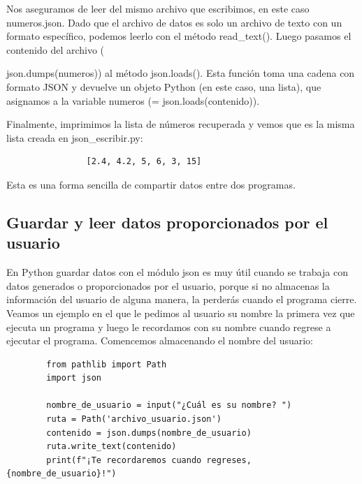 Nos aseguramos de leer del mismo archivo que escribimos, en este caso {\ttfamily numeros.json}. Dado que el archivo de datos es solo un archivo de texto con un formato específico, podemos leerlo con el método {\ttfamily read\_text()}. Luego pasamos el contenido del archivo ({{\ttfamily json.dumps(numeros)}) al método {\ttfamily json.loads()}. Esta función toma una cadena con formato  {\ttfamily JSON} y devuelve un objeto Python (en este caso, una lista), que asignamos a la variable {\ttfamily numeros} ({\ttfamily = json.loads(contenido)}). 
	
	Finalmente, imprimimos la lista de números recuperada y vemos que es la misma lista creada en {\ttfamily json\_escribir.py}:
	
	{\ttfamily\scriptsize\scriptsize 	
		\hspace{-0.65cm} \vspace{-0.3cm}	
		{\color{blue}			
			\begin{verbatim}
				[2.4, 4.2, 5, 6, 3, 15]
			\end{verbatim}
	}}
	
	Esta es una forma sencilla de compartir datos entre dos programas. 
	
	\subsection{Guardar y leer datos proporcionados por el usuario}
	
	En Python guardar datos con el módulo {\ttfamily json} es muy útil cuando se trabaja con datos generados o proporcionados por el usuario, porque si no almacenas la información del usuario de alguna manera, la perderás cuando el programa cierre.  
	Veamos un ejemplo en el que le pedimos al usuario su nombre la primera vez que ejecuta un programa y luego le recordamos con su nombre cuando regrese a ejecutar el programa. Comencemos almacenando el nombre del usuario:
	
	\hspace{-2.5cm}{\ttfamily \scriptsize registro.py}  \vspace{-0.5cm}
	\begin{lstlisting}
		from pathlib import Path
		import json
		
		nombre_de_usuario = input("¿Cuál es su nombre? ")
		ruta = Path('archivo_usuario.json') 
		contenido = json.dumps(nombre_de_usuario) 
		ruta.write_text(contenido) 
		print(f"¡Te recordaremos cuando regreses, {nombre_de_usuario}!")
	\end{lstlisting}
	
}
